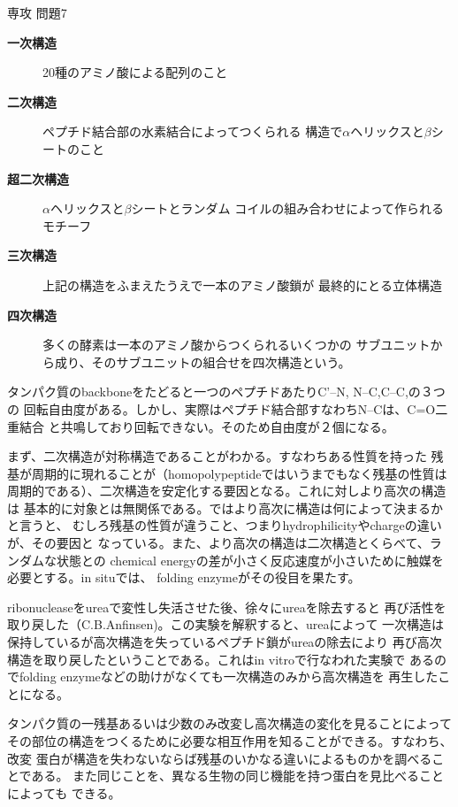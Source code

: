 \documentclass[fleqn]{jbook}
\begin{document}
\begin{answer}{専攻 問題7}{}

\begin{subanswers}
\SubAnswer

\begin{description}
\item[{\bf 一次構造}]\quad 20種のアミノ酸による配列のこと
\item[{\bf 二次構造}]\quad ペプチド結合部の水素結合によってつくられる
構造で$\alpha$ヘリックスと$\beta$シートのこと
\item[{\bf 超二次構造}]\quad $\alpha$ヘリックスと$\beta$シートとランダム
コイルの組み合わせによって作られるモチーフ
\item[{\bf 三次構造}]\quad 上記の構造をふまえたうえで一本のアミノ酸鎖が
最終的にとる立体構造
\item[{\bf 四次構造}]\quad 多くの酵素は一本のアミノ酸からつくられるいくつかの
サブユニットから成り、そのサブユニットの組合せを四次構造という。
\end{description}

\SubAnswer
タンパク質のbackboneをたどると一つのペプチドあたりC'--N,
N--C,C--C,の３つの
回転自由度がある。しかし、実際はペプチド結合部すなわちN--Cは、C=O二重結合
と共鳴しており回転できない。そのため自由度が２個になる。
\item まず、二次構造が対称構造であることがわかる。すなわちある性質を持った
残基が周期的に現れることが（homopolypeptideではいうまでもなく残基の性質は
周期的である）、二次構造を安定化する要因となる。これに対しより高次の構造は
基本的に対象とは無関係である。ではより高次に構造は何によって決まるかと言うと、
むしろ残基の性質が違うこと、つまりhydrophilicityやchargeの違いが、その要因と
なっている。また、より高次の構造は二次構造とくらべて、ランダムな状態との
chemical 
energyの差が小さく反応速度が小さいために触媒を必要とする。in situでは、
folding enzymeがその役目を果たす。

\SubAnswer
ribonucleaseをureaで変性し失活させた後、徐々にureaを除去すると
再び活性を取り戻した（C.B.Anfinsen)。この実験を解釈すると、ureaによって
一次構造は保持しているが高次構造を失っているペプチド鎖がureaの除去により
再び高次構造を取り戻したということである。これはin vitroで行なわれた実験で
あるのでfolding enzymeなどの助けがなくても一次構造のみから高次構造を
再生したことになる。

タンパク質の一残基あるいは少数のみ改変し高次構造の変化を見ることによって
その部位の構造をつくるために必要な相互作用を知ることができる。すなわち、改変
蛋白が構造を失わないならば残基のいかなる違いによるものかを調べることである。
また同じことを、異なる生物の同じ機能を持つ蛋白を見比べることによっても
できる。

\end{subanswers}
\end{answer}
\end{document}
